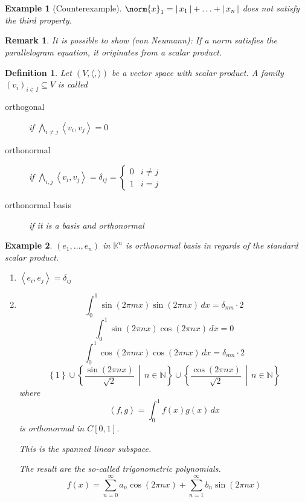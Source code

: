 \documentclass[a4paper,landscape,twocolumn]{article}
\newcommand\abs[1]{|\,#1\,|}
\newcommand\set[1]{\left\{#1\right\}}
\newcommand\setdef[2]{\left\{#1\,\middle|\,#2\right\}}
\newcommand\functional[1]{\left\langle{#1}\right\rangle}
\newtheorem{defi}{Definition}
\newtheorem{ex}{Example}
\newtheorem{rem}{Remark}
\DeclarePairedDelimiter\norm\lVert\rVert
\begin{document}
\begin{ex}[Counterexample]
  $\norm{x}_1 = \abs{x_1} + \ldots + \abs{x_n}$ does not satisfy the third property.
\end{ex}

\begin{rem}
  It is possible to show (von Neumann):
  If a norm satisfies the parallelogram equation,
  it originates from a scalar product.
\end{rem}

\begin{defi}
  Let $(V, \langle, \rangle)$ be a vector space with scalar product.
  A family $(v_i)_{i \in I} \subseteq V$ is called
  \begin{description}
    \item[orthogonal] if $\bigwedge_{i\neq j} \functional{v_i, v_j} = 0$
    \item[orthonormal] if $\bigwedge_{i,j} \functional{v_i, v_j} = \delta_{ij} = \begin{cases} 0 & i \neq j \\ 1 & i = j \end{cases}$
    \item[orthonormal basis] if it is a basis and orthonormal
  \end{description}
\end{defi}

\begin{ex}
  $(e_1, \ldots, e_n)$ in $\mathbb K^n$ is orthonormal basis in regards of the standard scalar product.
  \begin{enumerate}
    \item $\functional{e_i, e_j} = \delta_{ij}$
    \item
      \[ \int_0^1 \sin(2\pi mx) \sin(2\pi nx) \, dx = \delta_{mn} \cdot 2 \]
      \[ \int_0^1 \sin(2\pi nx) \cos(2\pi nx) \, dx = 0\]
      \[ \int_0^1 \cos(2\pi mx) \cos(2\pi nx) \, dx = \delta_{mn} \cdot 2 \]
      \[ \set{1} \cup \setdef{\frac{\sin(2\pi nx)}{\sqrt2}}{n \in \mathbb N} \cup \setdef{\frac{\cos(2\pi nx)}{\sqrt{2}}}{n \in \mathbb N} \]
      where
      \[ \functional{f,g} = \int_0^1 f(x) g(x) \, dx \]
      is orthonormal in $C[0,1]$.

      This is the spanned linear subspace.

      The result are the so-called trigonometric polynomials.
      \[ f(x) = \sum_{n=0}^\infty a_n \cos(2\pi nx) + \sum_{n=1}^\infty b_n \sin(2\pi nx) \]
  \end{enumerate}
\end{ex}
\end{document}
